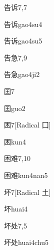 \begin{entry}{告诉}{7,7}
  \begin{phonetics}{告诉}{gao4su4}
  \end{phonetics}
  \begin{phonetics}{告诉}{gao4su5}
  \end{phonetics}
\end{entry}

\begin{entry}{告急}{7,9}
  \begin{phonetics}{告急}{gao4ji2}
  \end{phonetics}
\end{entry}

\begin{entry}{囯}{7}
  \begin{phonetics}{囯}{guo2}
  \end{phonetics}
\end{entry}

\begin{entry}{困}{7}[Radical ⼞]
  \begin{phonetics}{困}{kun4}
  \end{phonetics}
\end{entry}

\begin{entry}{困难}{7,10}
  \begin{phonetics}{困难}{kun4nan5}
  \end{phonetics}
\end{entry}

\begin{entry}{坏}{7}[Radical 土]
  \begin{phonetics}{坏}{huai4}
  \end{phonetics}
\end{entry}

\begin{entry}{坏处}{7,5}
  \begin{phonetics}{坏处}{huai4chu5}
  \end{phonetics}
\end{entry}

